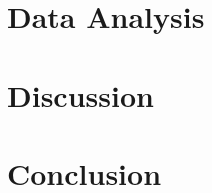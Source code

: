 \documentclass[12pt,a4paper,titlepage,oneside,english]{article}
\begin{document}

\section{Data Analysis}





\section{Discussion}




\section{Conclusion}




\newpage
\setcounter{page}{1}
\onehalfspacing
{}



\end{document}
